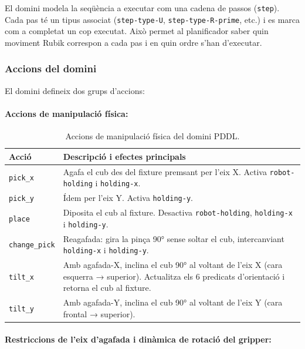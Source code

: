 \documentclass[12pt, a4paper]{article}
\begin{document}
El domini modela la seqüència a executar com una cadena de passos (\texttt{step}). Cada pas té un tipus associat (\texttt{step-type-U}, \texttt{step-type-R-prime}, etc.) i es marca com a completat un cop executat. Això permet al planificador saber quin moviment Rubik correspon a cada pas i en quin ordre s'han d'executar.

\subsubsection{Accions del domini}

El domini defineix dos grups d'accions:

\paragraph{Accions de manipulació física:}

\begin{table}[H]
  \centering
  \begin{tabular}{lp{9.5cm}}
    \toprule
    \textbf{Acció} & \textbf{Descripció i efectes principals} \\
    \midrule
    \texttt{pick\_x} & Agafa el cub des del fixture premsant per l'eix X. Activa \texttt{robot-holding} i \texttt{holding-x}. \\
    \texttt{pick\_y} & Ídem per l'eix Y. Activa \texttt{holding-y}. \\
    \texttt{place}   & Diposita el cub al fixture. Desactiva \texttt{robot-holding}, \texttt{holding-x} i \texttt{holding-y}. \\
    \texttt{change\_pick} & Reagafada: gira la pinça 90° sense soltar el cub, intercanviant \texttt{holding-x} i \texttt{holding-y}. \\
    \texttt{tilt\_x} & Amb agafada-X, inclina el cub 90° al voltant de l'eix X (cara esquerra → superior). Actualitza els 6 predicats d'orientació i retorna el cub al fixture. \\
    \texttt{tilt\_y} & Amb agafada-Y, inclina el cub 90° al voltant de l'eix Y (cara frontal → superior). \\
    \bottomrule
  \end{tabular}
  \caption{Accions de manipulació física del domini PDDL.}
  \label{tab:pddl_manip}
\end{table}

\paragraph{Restriccions de l'eix d'agafada i dinàmica de rotació del gripper:}
\end{document}
